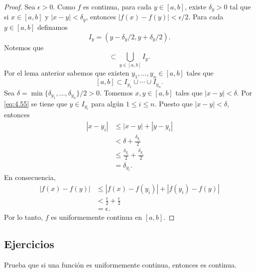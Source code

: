 \documentclass[12pt,a4paper]{book}
\begin{document}
    \begin{proof}
        Sea $\epsilon>0$. Como $f$ es continua, para cada $y\in[a,b]$, existe
        $\delta_{y}>0$ tal que si $x\in[a,b]$ y $|x-y|<\delta_{y}$, entonces $|f(x)-f(y)|<\epsilon/2$. Para
        cada $y\in[a,b]$ definamos
        \begin{equation*}
            I_{y}=(y-\delta_{y}/2,y+\delta_{y}/2).
        \end{equation*}
        Notemos que
        \begin{equation*}
            [a,b]\subset\bigcup_{y\in[a,b]}I_{y}.
        \end{equation*}
        Por el lema anterior sabemos que existen $y_{1},\ldots,y_{n}\in[a,b]$ tales que
        \begin{equation}\label{eq:4.55}
            [a,b]\subset I_{y_{1}}\cup\cdots\cup I_{y_{n}}.
        \end{equation}
        Sea $\delta=\min\{\delta_{y_{1}},\ldots,\delta_{y_{n}}\}/2>0$. Tomemos $x,y\in[a,b]$ tales que $|x-y|<\delta$.
        Por \eqref{eq:4.55} se tiene que $y\in I_{y_{i}}$ para algún $1\leq i\leq n$. Puesto que $|x-y|<\delta$,
        entonces
        \begin{align*}
            |x-y_{i}|&\leq|x-y|+|y-y_{i}|\\
            &<\delta+\frac{\delta_{y_{i}}}{2}\\
            &\leq\frac{\delta_{y_{i}}}{2}+\frac{\delta_{y_{i}}}{2}\\
            &=\delta_{y_{i}}.
        \end{align*}
        En consecuencia,
        \begin{align*}
            |f(x)-f(y)|&\leq|f(x)-f(y_{i})|+|f(y_{i})-f(y)|\\
            &<\frac{\epsilon}{2}+\frac{\epsilon}{2}\\
            &=\epsilon.
        \end{align*}
        Por lo tanto, $f$ es uniformemente continua en $[a,b]$.
    \end{proof}

    \par{}\subsection*{Ejercicios}

    \begin{ejercicio}\label{ej:222}
        Prueba que si una función es uniformemente continua,
        entonces es continua.
    \end{ejercicio}
\end{document}
